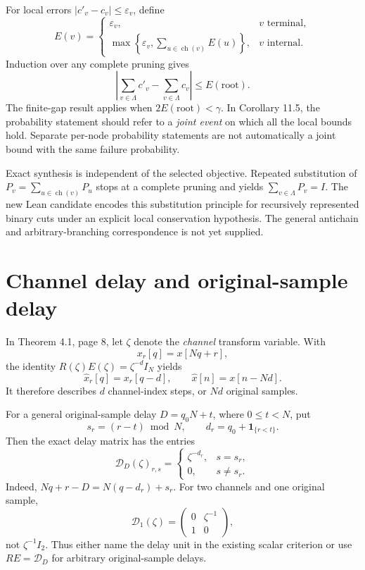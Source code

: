 \documentclass[11pt]{article}
\begin{document}
For local errors $|c'_v-c_v|\le\varepsilon_v$, define
\[
E(v)=
\begin{cases}
\varepsilon_v,&v\text{ terminal},\\
\max\left\{\varepsilon_v,\sum_{u\in\operatorname{ch}(v)}E(u)\right\},&v\text{ internal}.
\end{cases}
\]
Induction over any complete pruning gives
\[
\left|\sum_{v\in\Lambda}c'_v-\sum_{v\in\Lambda}c_v\right|\le E(\mathrm{root}).
\]
The finite-gap result applies when $2E(\mathrm{root})<\gamma$. In Corollary 11.5, the probability statement should refer to a \emph{joint event} on which all the local bounds hold. Separate per-node probability statements are not automatically a joint bound with the same failure probability.

Exact synthesis is independent of the selected objective. Repeated substitution of $P_v=\sum_{u\in\operatorname{ch}(v)}P_u$ stops at a complete pruning and yields $\sum_{v\in\Lambda}P_v=I$. The new Lean candidate encodes this substitution principle for recursively represented binary cuts under an explicit local conservation hypothesis. The general antichain and arbitrary-branching correspondence is not yet supplied.

\section{Channel delay and original-sample delay}
In Theorem 4.1, page 8, let $\zeta$ denote the \emph{channel} transform variable. With
\[
x_r[q]=x[Nq+r],
\]
the identity $R(\zeta)E(\zeta)=\zeta^{-d}I_N$ yields
\[
\widehat x_r[q]=x_r[q-d],\qquad
\widehat x[n]=x[n-Nd].
\]
It therefore describes $d$ channel-index steps, or $Nd$ original samples.

For a general original-sample delay $D=q_0N+t$, where $0\le t<N$, put
\[
s_r=(r-t)\bmod N,\qquad d_r=q_0+\mathbf1_{\{r<t\}}.
\]
Then the exact delay matrix has the entries
\[
\mathcal D_D(\zeta)_{r,s}=
\begin{cases}
\zeta^{-d_r},&s=s_r,\\
0,&s\ne s_r.
\end{cases}
\]
Indeed, $Nq+r-D=N(q-d_r)+s_r$. For two channels and one original sample,
\[
\mathcal D_1(\zeta)=
\begin{pmatrix}0&\zeta^{-1}\\1&0\end{pmatrix},
\]
not $\zeta^{-1}I_2$. Thus either name the delay unit in the existing scalar criterion or use $R E=\mathcal D_D$ for arbitrary original-sample delays.
\end{document}
